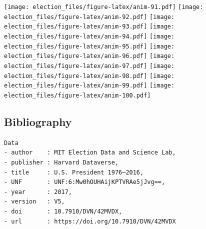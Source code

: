 \documentclass[
]{article}
\begin{document}
\texttt{[image: election\_files/figure-latex/anim-91.pdf]}
\texttt{[image: election\_files/figure-latex/anim-92.pdf]}
\texttt{[image: election\_files/figure-latex/anim-93.pdf]}
\texttt{[image: election\_files/figure-latex/anim-94.pdf]}
\texttt{[image: election\_files/figure-latex/anim-95.pdf]}
\texttt{[image: election\_files/figure-latex/anim-96.pdf]}
\texttt{[image: election\_files/figure-latex/anim-97.pdf]}
\texttt{[image: election\_files/figure-latex/anim-98.pdf]}
\texttt{[image: election\_files/figure-latex/anim-99.pdf]}
\texttt{[image: election\_files/figure-latex/anim-100.pdf]}

\hypertarget{bibliography}{%
\subsection{Bibliography}\label{bibliography}}

\begin{verbatim}
Data
- author    : MIT Election Data and Science Lab,
- publisher : Harvard Dataverse,
- title     : U.S. President 1976–2016,
- UNF       : UNF:6:Mw0hOUHAijKPTVRAe5jJvg==,
- year      : 2017,
- version   : V5,
- doi       : 10.7910/DVN/42MVDX,
- url       : https://doi.org/10.7910/DVN/42MVDX
\end{verbatim}
\end{document}
